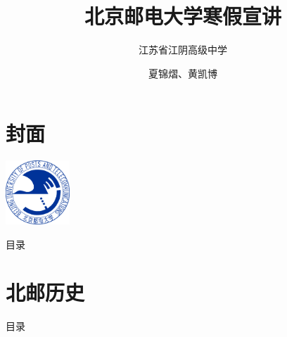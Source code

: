 \documentclass[aspectratio=169, utf8, fontset=windows]{beamer}
\title[北京邮电大学]{北京邮电大学寒假宣讲}
\subtitle{江苏省江阴高级中学}
\author{夏锦熠、黄凯博}
\institute[网络空间安全学院]{北京邮电大学网络空间安全学院}
\date{}
\begin{document}
\section*{封面}

\begin{frame}
    \centering
    \vspace{1em}
    \includegraphics[width=0.18\textwidth]{./resources/logo.png}\\[0pt]
    \titlepage
\end{frame}

\setlength{\parskip}{0.5em}

\begin{frame}{目录}
    \begin{multicols}{2}
        \tableofcontents
    \end{multicols}
\end{frame}

\section{北邮历史}

\begin{frame}{目录}
    \begin{multicols}{2}
        \tableofcontents[sectionstyle=show,subsectionstyle=hide,currentsection]
    \end{multicols}
\end{frame}
\end{document}

